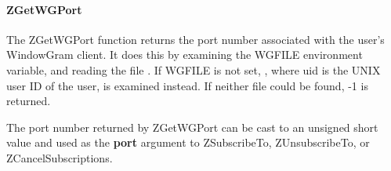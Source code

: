 \paragraph{ZGetWGPort}
\label{ZGetWGPort}

\etemplate
{}

The ZGetWGPort function returns the port number associated with the
user's WindowGram client.  It does this by examining the WGFILE
environment variable, and reading the file .
If WGFILE is not set, , where uid is the
UNIX user ID of the user, is examined instead.  If neither file could be
found, -1 is returned.

The port number returned by ZGetWGPort can be cast to an unsigned short
value and used as the {\bf port} argument to ZSubscribeTo,
ZUnsubscribeTo, or ZCancelSubscriptions.
